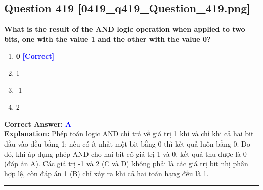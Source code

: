 \documentclass[11pt,a4paper]{article}
\begin{document}
\begin{minipage}{\textwidth}
\subsection*{Question 419 \quad \footnotesize{[0419\_q419\_Question\_419.png]}}
\noindent \textbf{What is the result of the AND logic operation when applied to two bits, one with the value 1 and the other with the value 0?}

\begin{enumerate}[label=\Alph*.]
    \item \textbf{0} \hfill \textcolor{blue}{\textbf{[Correct]}}
    \item 1
    \item -1
    \item 2
\end{enumerate}

\noindent \textbf{Correct Answer:} \textcolor{blue}{\textbf{A}} \\[2pt]
\noindent \textbf{Explanation:} Phép toán logic AND chỉ trả về giá trị 1 khi và chỉ khi cả hai bit đầu vào đều bằng 1; nếu có ít nhất một bit bằng 0 thì kết quả luôn bằng 0. Do đó, khi áp dụng phép AND cho hai bit có giá trị 1 và 0, kết quả thu được là 0 (đáp án A). Các giá trị -1 và 2 (C và D) không phải là các giá trị bit nhị phân hợp lệ, còn đáp án 1 (B) chỉ xảy ra khi cả hai toán hạng đều là 1.

\par\vspace{0.3cm}
\hrule
\vspace{0.3cm}
\end{minipage}
\end{document}
